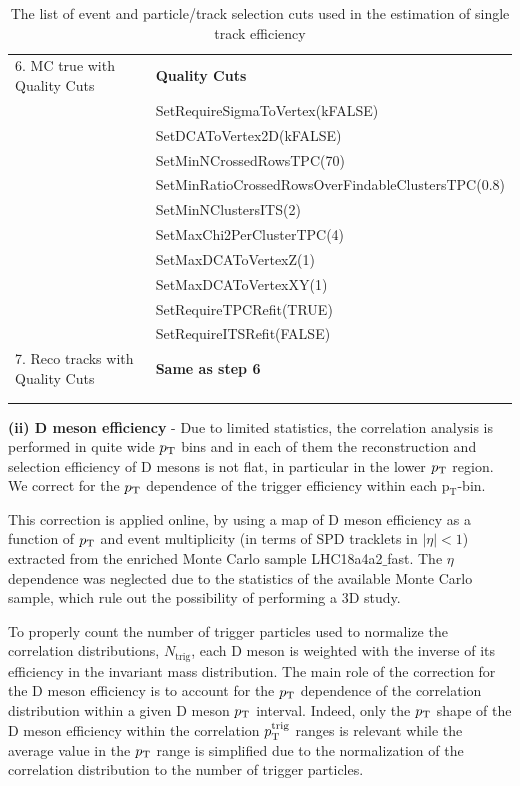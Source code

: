 \begin{table}[h]
\begin{tabular}{  p{5cm} |  p{8.5cm} }
6. MC true with Quality Cuts         &      			      {\textbf  {Quality Cuts }} \\
																	&SetRequireSigmaToVertex(kFALSE) \\
																	&SetDCAToVertex2D(kFALSE) \\
																	&SetMinNCrossedRowsTPC(70)\\
																	&SetMinRatioCrossedRowsOverFindableClustersTPC(0.8)\\
																	&SetMinNClustersITS(2)\\
																	&SetMaxChi2PerClusterTPC(4)\\
																	&SetMaxDCAToVertexZ(1) \\
																	&SetMaxDCAToVertexXY(1) \\
																	&SetRequireTPCRefit(TRUE) \\
																	&SetRequireITSRefit(FALSE) \\

7. Reco tracks with Quality Cuts         &             {\textbf  {Same as step 6}} \\

 &\\		            	            		

 \hline \hline
 \\
\end{tabular}
\caption{\large {The list of event and particle/track selection cuts used in the estimation of single track efficiency}} %
\label{table:effCuts}	
\end{table}

{\bf \large (ii) D meson efficiency} - Due to limited statistics, the correlation analysis is performed in quite wide $p_{\rm T}$ bins and in each of them the reconstruction and selection efficiency of D mesons is not flat, in particular in the lower $p_{\rm T}$ region. We correct for the $p_{\rm T}$ dependence of the trigger efficiency within each p$_\mathrm{T}$-bin.

This correction is applied online, by using a map of D meson efficiency as a function of $p_{\rm T}$ and event multiplicity (in terms of SPD tracklets in $|\eta|<1$) extracted from the enriched Monte Carlo sample LHC18a4a2$\_$fast. The $\eta$ dependence was neglected due to the statistics of the available Monte Carlo sample, which rule out the possibility of performing a 3D study.

To properly count the number of trigger particles used to normalize the correlation distributions, $N_\text{trig}$, each D meson is weighted with the inverse of its efficiency in the invariant mass distribution. The main role of the correction for the D meson efficiency is to account for the $p_{\rm T}$ dependence of the correlation distribution within a given D meson $p_{\rm T}$ interval. Indeed, only the $p_{\rm T}$ shape of the D meson efficiency within the correlation $p_{\rm T}^{\rm trig}$ ranges is relevant while the average value
in the $p_{\rm T}$ range is simplified due to the normalization of the correlation distribution to the number of trigger particles.


